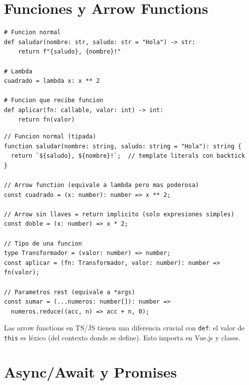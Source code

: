 \documentclass[11pt,a4paper]{article}
\begin{document}
\section{Funciones y Arrow Functions}

\begin{pybox}
\begin{lstlisting}[style=python]
# Funcion normal
def saludar(nombre: str, saludo: str = "Hola") -> str:
    return f"{saludo}, {nombre}!"

# Lambda
cuadrado = lambda x: x ** 2

# Funcion que recibe funcion
def aplicar(fn: callable, valor: int) -> int:
    return fn(valor)
\end{lstlisting}
\end{pybox}

\begin{tsbox}
\begin{lstlisting}[style=typescript]
// Funcion normal (tipada)
function saludar(nombre: string, saludo: string = "Hola"): string {
  return `${saludo}, ${nombre}!`;  // template literals con backtick
}

// Arrow function (equivale a lambda pero mas poderosa)
const cuadrado = (x: number): number => x ** 2;

// Arrow sin llaves = return implicito (solo expresiones simples)
const doble = (x: number) => x * 2;

// Tipo de una funcion
type Transformador = (valor: number) => number;
const aplicar = (fn: Transformador, valor: number): number => fn(valor);

// Parametros rest (equivale a *args)
const sumar = (...numeros: number[]): number =>
  numeros.reduce((acc, n) => acc + n, 0);
\end{lstlisting}
\end{tsbox}

\begin{tipbox}
Las arrow functions en TS/JS tienen una diferencia crucial con \texttt{def}: el valor de
\texttt{this} es léxico (del contexto donde se define). Esto importa en Vue.js y clases.
\end{tipbox}

\section{Async/Await y Promises}
\end{document}
